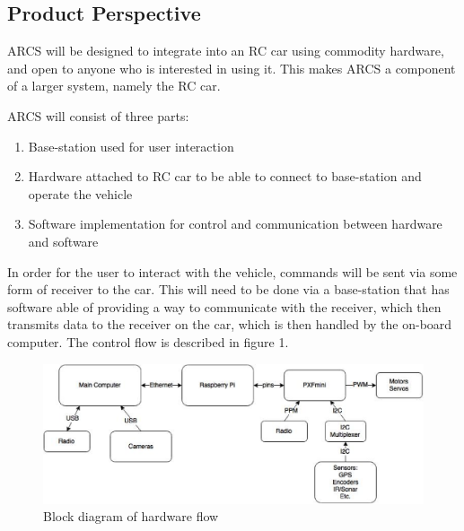 \documentclass[compsoc,draftclsnofoot,onecolumn,10pt]{IEEEtran}
\begin{document}
\subsection{Product Perspective} %
ARCS will be designed to integrate into an RC car using commodity hardware, and open to anyone who is interested in using it. This 
makes ARCS a component of a larger system, namely the RC car. \par
ARCS will consist of three parts: 
\begin{enumerate}
	\item Base-station used for user interaction
	\item Hardware attached to RC car to be able to connect to base-station and 
		operate the vehicle
	\item Software implementation for control and communication between hardware and software
\end{enumerate}
In order for the user to interact with the vehicle, commands will be sent via some form
of receiver to the car. This will need to be done via a base-station that has software able of
providing a way to communicate with the receiver, which then transmits data to the receiver on 
the car, which is then handled by the on-board computer. 
The control flow is described in figure 1. \\

\begin{figure}
  \centering
 \includegraphics[width=\textwidth]{Block_Diagram_1_.eps}
  \caption{Block diagram of hardware flow}
\end{figure}
\end{document}
